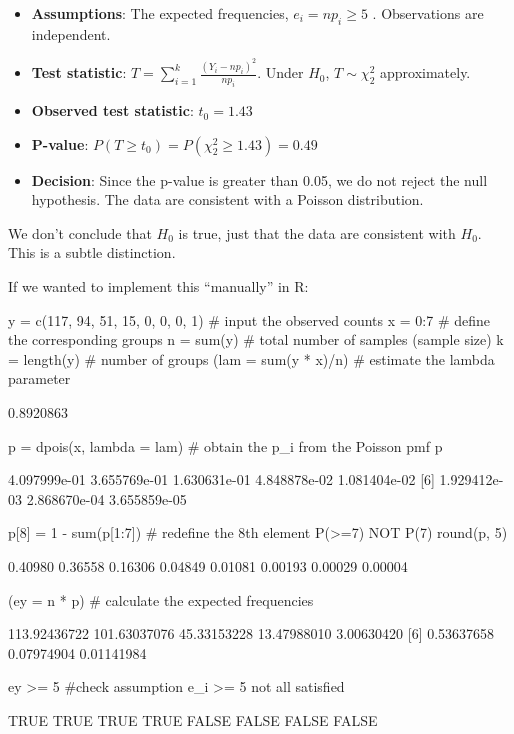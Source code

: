\documentclass[a4paper]{article}
\begin{document}
\begin{itemize}
	\item \textbf{Assumptions}: The expected frequencies, \( e_i = np_i \geq 5 \) . Observations are independent.
	\item \textbf{Test statistic}: \( T=\sum\limits_{i=1}^k \frac{(Y_i-n p_i)^2}{n p_i} \). Under \( H_0 \), \( T \sim \chi^2_2 \) approximately.
	\item \textbf{Observed test statistic}: \( t_0 = 1.43 \) 
	\item \textbf{P-value}: \( P(T \geq t_0) = P(\chi_2^2 \geq 1.43) = 0.49 \) 
	\item \textbf{Decision}: Since the p-value is greater than 0.05, we do not reject the null hypothesis. The data are consistent with a Poisson distribution.
\end{itemize}
\begin{goldbox}
	We don't conclude that \( H_0 \) is true, just that the data are consistent with \( H_0 \). This is a subtle distinction.
\end{goldbox}
If we wanted to implement this ``manually'' in R:
\begin{Schunk}
\begin{Sinput}
y = c(117, 94, 51, 15, 0, 0, 0, 1) # input the observed counts
x = 0:7 # define the corresponding groups
n = sum(y) # total number of samples (sample size)
k = length(y) # number of groups
(lam = sum(y * x)/n) # estimate the lambda parameter
\end{Sinput}
\begin{Soutput}
[1] 0.8920863
\end{Soutput}
\begin{Sinput}
p = dpois(x, lambda = lam) # obtain the p_i from the Poisson pmf
p
\end{Sinput}
\begin{Soutput}
[1] 4.097999e-01 3.655769e-01 1.630631e-01 4.848878e-02 1.081404e-02
[6] 1.929412e-03 2.868670e-04 3.655859e-05
\end{Soutput}
\begin{Sinput}
p[8] = 1 - sum(p[1:7]) # redefine the 8th element P(>=7) NOT P(7)
round(p, 5)
\end{Sinput}
\begin{Soutput}
[1] 0.40980 0.36558 0.16306 0.04849 0.01081 0.00193 0.00029 0.00004
\end{Soutput}
\begin{Sinput}
(ey = n * p) # calculate the expected frequencies
\end{Sinput}
\begin{Soutput}
[1] 113.92436722 101.63037076  45.33153228  13.47988010   3.00630420
[6]   0.53637658   0.07974904   0.01141984
\end{Soutput}
\begin{Sinput}
ey >= 5 #check assumption e_i >= 5 not all satisfied
\end{Sinput}
\begin{Soutput}
[1]  TRUE  TRUE  TRUE  TRUE FALSE FALSE FALSE FALSE
\end{Soutput}
\end{Schunk}
\end{document}
